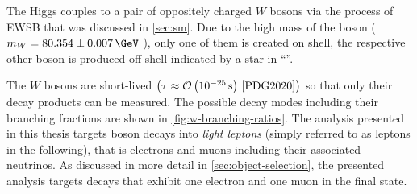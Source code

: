 
The Higgs couples to a pair of oppositely charged $W$ bosons via the process of EWSB that was discussed in \cref{sec:sm}. Due to the high mass of the \Wboson boson ($m_W = 80.354 \pm 0.007\,\GeV$ \cite{PDG2020}), only one of them is created on shell, the respective other boson is produced off shell indicated by a star in ``\HWW''.

The $W$ bosons are short-lived $\left( \tau \approx \mathcal{O}\left(10^{-25}\,\text{s}\right)\,\text{\cite{PDG2020}}  \right)$ so that only their decay products can be measured. The possible decay modes including their branching fractions are shown in \cref{fig:w-branching-ratios}. The analysis presented in this thesis targets \Wboson boson decays into \emph{light leptons} (simply referred to as leptons in the following), that is electrons and muons including their associated neutrinos.
As discussed in more detail in \cref{sec:object-selection}, the presented analysis targets \HWW decays that exhibit one electron and one muon in the final state.

